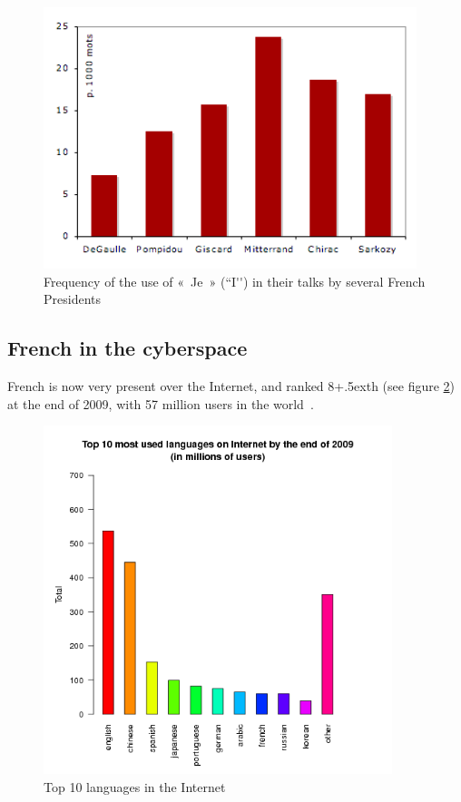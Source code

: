 \documentclass[]{../metanetpaper}
\begin{document}
\begin{multicols}{2}
\begin{figure}[!ht]
\begin{center}
 \includegraphics[height=3.0in]{../_media/french/french_pix1_freq_je.png} 
  \caption{Frequency of the use of «~Je~» (``I{\mbox '}{\mbox '}) in their talks by several French Presidents}
  \label{fig:je_stats_en}
\end{center}
\end{figure}

\subsection{French in the cyberspace}

French is now very present over the Internet, and ranked
8\raise+.5ex\hbox{th} (see figure \ref{fig:internettop10_en}) at the end
of 2009, with 57 million users in the world~\cite{internettop10}.

\begin{figure}[!ht]
\begin{center}
 \includegraphics[height=4.0in]{../_media/french/french_pix2_top_10_Internet_languages_2010_english.png}
  \caption{Top 10 languages in the Internet~\cite{internettop10}}
  \label{fig:internettop10_en}
\end{center}
\end{figure}


\end{multicols}
\end{document}
